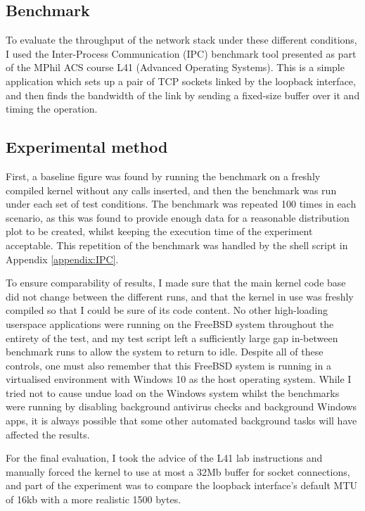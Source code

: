 \documentclass[a4paper,12pt,twoside,openright]{report}
\begin{document}
	\subsection{Benchmark}
	
	To evaluate the throughput of the network stack under these different conditions, I used the Inter-Process Communication (IPC) benchmark tool presented as part of the MPhil ACS course L41 (Advanced Operating Systems)\cite{L41}. This is a simple application which sets up a pair of TCP sockets linked by the loopback interface, and then finds the bandwidth of the link by sending a fixed-size buffer over it and timing the operation.
	
	\subsection{Experimental method}
	
	First, a baseline figure was found by running the benchmark on a freshly compiled kernel without any calls inserted, and then the benchmark was run under each set of test conditions. The benchmark was repeated 100 times in each scenario, as this was found to provide enough data for a reasonable distribution plot to be created, whilst keeping the execution time of the experiment acceptable. This repetition of the benchmark was handled by the shell script in Appendix \ref{appendix:IPC}.
	
	To ensure comparability of results, I made sure that the main kernel code base did not change between the different runs, and that the kernel in use was freshly compiled so that I could be sure of its code content. No other high-loading userspace applications were running on the FreeBSD system throughout the entirety of the test, and my test script left a sufficiently large gap in-between benchmark runs to allow the system to return to idle. Despite all of these controls, one must also remember that this FreeBSD system is running in a virtualised environment with Windows 10 as the host operating system. While I tried not to cause undue load on the Windows system whilst the benchmarks were running by disabling background antivirus checks and background Windows apps, it is always possible that some other automated background tasks will have affected the results.
	
	For the final evaluation, I took the advice of the L41 lab instructions and manually forced the kernel to use at most a 32Mb buffer for socket connections, and part of the experiment was to compare the loopback interface's default MTU of 16kb with a more realistic 1500 bytes.
	
\end{document}
